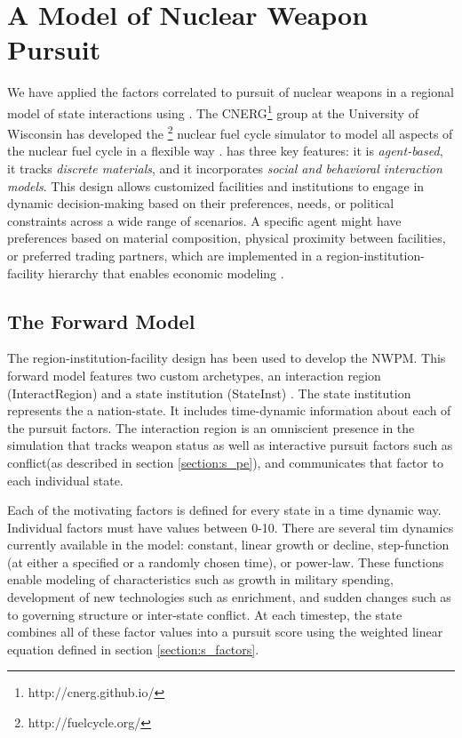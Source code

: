 \section{A \Cyclus Model of Nuclear Weapon Pursuit}
\label{s_methods}

We have applied the factors correlated to pursuit of nuclear weapons in a regional model of state interactions using \Cyclus\cite{huff_open_2011,huff_fundamental_2016,gidden_agent-based_2013}.  The \gls{CNERG}\footnote{http://cnerg.github.io/} group at the University of Wisconsin has developed the \Cyclus\footnote{http://fuelcycle.org/} nuclear fuel cycle simulator to model all aspects of the nuclear fuel cycle in a flexible way \cite{cyclus_v1_3}.  \Cyclus has three key features: it is \textit{agent-based}, it tracks \textit{discrete materials}, and it incorporates \textit{social and behavioral interaction models}\cite{jennings_agent-based_2000, taylor2014agent}. This design allows customized facilities and institutions to engage in dynamic decision-making based on their preferences, needs, or political constraints across a wide range of scenarios.  A specific agent might have preferences based on material composition, physical proximity between facilities, or preferred trading partners, which are implemented in a region-institution-facility hierarchy that enables economic modeling \cite{oliver_geniusv2:_2009}.

\subsection{The Forward Model}

The region-institution-facility design has been used to develop the \gls{NWPM}. This forward model features two custom archetypes, an interaction region (InteractRegion) and a state institution (StateInst) .  The state institution represents the a nation-state.  It includes time-dynamic information about each of the pursuit factors. The interaction region is an omniscient presence in the simulation that tracks weapon status as well as interactive pursuit factors such as conflict(as described in section \ref{section:s_pe}), and communicates that factor to each individual state. 

Each of the motivating factors is defined for every state in a time dynamic way. Individual factors must have values between 0-10. There are several tim dynamics currently available in the model: constant, linear growth or decline, step-function (at either a specified or a randomly chosen time), or power-law.  These functions enable modeling of characteristics such as growth in military spending, development of new technologies such as enrichment, and sudden changes such as to governing structure or inter-state conflict.  At each timestep, the state combines all of these factor values into a pursuit score using the weighted linear equation defined in section \ref{section:s_factors}.

